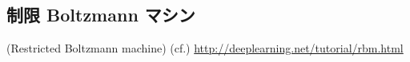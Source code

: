 \subsection{制限 Boltzmann マシン}
(Restricted Boltzmann machine) 
(cf.) \url{http://deeplearning.net/tutorial/rbm.html}
